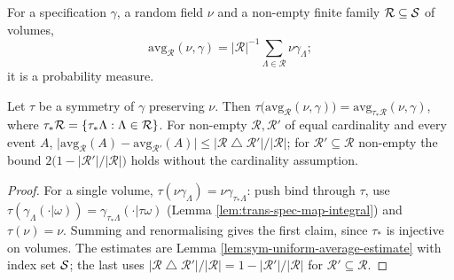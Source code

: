 \begin{definition}
    \label{def:sym-average}
    \leanok

    For a specification $\gamma$, a random field $\nu$ and a non-empty finite family
    $\mathcal{R} \subseteq \mathcal{S}$ of volumes,
    \[
      \mathrm{avg}_{\mathcal{R}}(\nu,\gamma)
        = |\mathcal{R}|^{-1} \sum_{\Lambda \in \mathcal{R}} \nu\gamma_\Lambda ;
    \]
    it is a probability measure.
\end{definition}

\begin{lemma}
    \label{lem:sym-average-transport}
    \leanok

    Let $\tau$ be a symmetry of $\gamma$ preserving $\nu$. Then
    $\tau\bigl(\mathrm{avg}_{\mathcal{R}}(\nu,\gamma)\bigr)
      = \mathrm{avg}_{\tau_*\mathcal{R}}(\nu,\gamma)$, where
    $\tau_*\mathcal{R} = \left\{ \tau_*\Lambda : \Lambda \in \mathcal{R} \right\}$. For non-empty
    $\mathcal{R}, \mathcal{R}'$ of equal cardinality and every event $A$,
    $\bigl|\mathrm{avg}_{\mathcal{R}}(A) - \mathrm{avg}_{\mathcal{R}'}(A)\bigr|
      \le |\mathcal{R} \mathbin{\triangle} \mathcal{R}'| / |\mathcal{R}|$; for
    $\mathcal{R}' \subseteq \mathcal{R}$ non-empty the bound
    $2\bigl(1 - |\mathcal{R}'|/|\mathcal{R}|\bigr)$ holds without the cardinality assumption.
\end{lemma}
\begin{proof}
    \leanok

    For a single volume, $\tau(\nu\gamma_\Lambda) = \nu\gamma_{\tau_*\Lambda}$: push
    $\mathrm{bind}$ through $\tau$, use $\tau(\gamma_\Lambda(\cdot|\omega)) =
    \gamma_{\tau_*\Lambda}(\cdot|\tau\omega)$ (Lemma \ref{lem:trans-spec-map-integral}) and
    $\tau(\nu) = \nu$. Summing and renormalising gives the first claim, since $\tau_*$ is
    injective on volumes. The estimates are Lemma \ref{lem:sym-uniform-average-estimate} with
    index set $\mathcal{S}$; the last uses
    $|\mathcal{R} \mathbin{\triangle} \mathcal{R}'| / |\mathcal{R}| =
    1 - |\mathcal{R}'|/|\mathcal{R}|$ for $\mathcal{R}' \subseteq \mathcal{R}$.
\end{proof}

